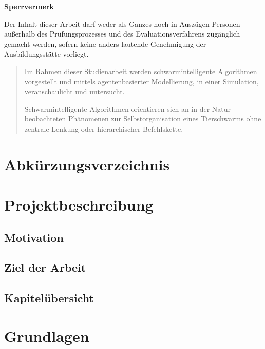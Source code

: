 \documentclass[a4paper, 11pt]{article}
\makeatletter
\newcommand*{\maintoc}{%
	\begingroup
	\@fileswfalse%
	\renewcommand*{\appendixattoc}{%
		\value{tocdepth}=-10000 %
	}%
	\tableofcontents%
	\endgroup
}
\newcommand*{\appendixattoc}{%
}
\makeatother
\begin{document}
\newpage
\begin{framed}
	\begin{center}
		\Large\bfseries Sperrvermerk
	\end{center}
	\medskip
	\noindent
	Der Inhalt dieser Arbeit darf weder als Ganzes noch in Auszügen Personen
	außerhalb des Prüfungsprozesses und des Evaluationsverfahrens zugänglich gemacht
	werden, sofern keine anders lautende Genehmigung der Ausbildungsstätte vorliegt.
\end{framed}
\newpage
{}
\renewcommand{\abstractname}{Zusammenfassung}
\begin{abstract}
Im Rahmen dieser Studienarbeit werden schwarmintelligente Algorithmen vorgestellt und mittels agentenbasierter Modellierung, in einer Simulation, veranschaulicht und untersucht. 

Schwarmintelligente Algorithmen orientieren sich an in der Natur beobachteten Phänomenen zur Selbstorganisation eines Tierschwarms ohne zentrale Lenkung oder hierarchischer Befehlskette.
\end{abstract}
\newpage
\maintoc           %
\newpage
\listoffigures             %
\newpage
\listoftables              %
\newpage
\section*{\Large \textbf Abkürzungsverzeichnis}  
\begin{acronym}[Bash]
\end{acronym}
\newpage
{} 
\section{Projektbeschreibung}
\subsection{Motivation}

\subsection{Ziel der Arbeit}
\subsection{Kapitelübersicht}
\newpage
\section{Grundlagen}
\end{document}
